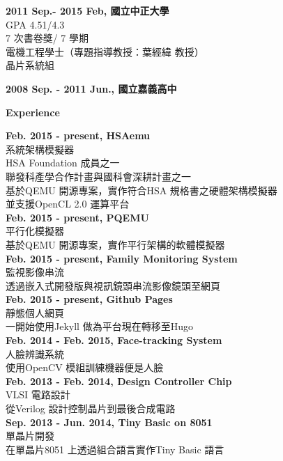 \documentclass[a4paper,12pt,final]{memoir}
\newcommand{\Sep}{\vspace{1.5em}}
\newcommand{\SmallSep}{\vspace{0.5em}}
\newcommand{\CVSection}[1]
	{\Large\textbf{#1}\par
	\SmallSep\normalsize\normalfont}
\newcommand{\CVItem}[1]
	{\textbf{\color{RoyalBlue} #1}}
\begin{document}
\CVItem{2011 Sep.- 2015 Feb, 國立中正大學}\\
GPA 4.51/4.3 \\
7 次書卷獎/ 7 學期\\
電機工程學士（專題指導教授：葉經緯 教授）\\
晶片系統組 
\SmallSep

\CVItem{2008 Sep. - 2011 Jun., 國立嘉義高中}\\
\Sep

\CVSection{Experience}
\CVItem{Feb. 2015 - present, HSAemu}\\
系統架構模擬器\\
HSA Foundation 成員之一\\
聯發科產學合作計畫與國科會深耕計畫之一\\
基於QEMU 開源專案，實作符合HSA 規格書之硬體架構模擬器\\
並支援OpenCL 2.0 運算平台\\
\SmallSep
\CVItem{Feb. 2015 - present, PQEMU}\\
平行化模擬器\\
基於QEMU 開源專案，實作平行架構的軟體模擬器\\
\SmallSep
\CVItem{Feb. 2015 - present, Family Monitoring System}\\
監視影像串流\\
透過嵌入式開發版與視訊鏡頭串流影像鏡頭至網頁\\
\SmallSep
\CVItem{Feb. 2015 - present, Github Pages}\\
靜態個人網頁\\
一開始使用Jekyll 做為平台現在轉移至Hugo\\
\SmallSep
\CVItem{Feb. 2014 - Feb. 2015, Face-tracking System}\\
人臉辨識系統\\
使用OpenCV 模組訓練機器便是人臉\\
\SmallSep
\CVItem{Feb. 2013 - Feb. 2014, Design Controller Chip}\\
VLSI 電路設計\\
從Verilog 設計控制晶片到最後合成電路\\
\SmallSep
\CVItem{Sep. 2013 - Jun. 2014, Tiny Basic on 8051}\\
單晶片開發\\
在單晶片8051 上透過組合語言實作Tiny Basic 語言\\
\Sep

\newpage
\end{document}
